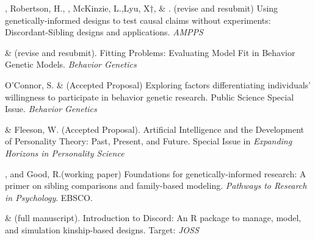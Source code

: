 \item \meb, Robertson, H.\noteA, \jt, McKinzie, L.,\noteA Lyu, X$\dagger$, \& \joe. (revise and resubmit) Using genetically-informed designs to test causal claims without experiments: Discordant-Sibling designs and applications. \href{https://osf.io/zpdwt/}{\small\color{blue}{osf.io/zpdwt/}} \textit{AMPPS} %

\item \meb \& \joe (revise and resubmit). Fitting Problems: Evaluating Model Fit in Behavior Genetic Models. \textit{Behavior Genetics}  \href{https://doi.org/10.31234/osf.io/qys83}{\small\color{blue}{10.31234/osf.io/qys83}}


\item O'Connor, S. \& \meb (Accepted Proposal) Exploring factors differentiating individuals’ willingness to participate in behavior genetic research. Public Science Special Issue. \textit{Behavior Genetics}

\item \meb \& Fleeson, W. (Accepted Proposal). Artificial Intelligence and the Development of Personality Theory: Past, Present, and Future. Special Issue in \textit{Expanding Horizons in Personality Science}


\item \meb, and Good, R.\noteA (working paper) Foundations for genetically-informed research: A primer on sibling comparisons and family-based modeling. \textit{Pathways to Research in Psychology}. EBSCO.

\break
%





\item \jt \& \meb (full manuscript). Introduction to Discord: An R package to manage, model, and simulation kinship-based designs. Target: \textit{JOSS}

